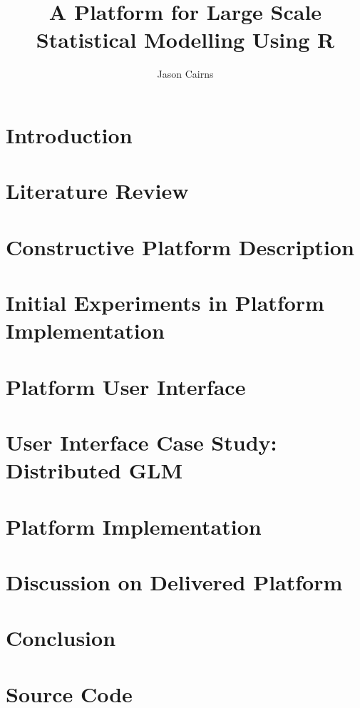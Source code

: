 \documentclass[11pt,a4paper,partial,examcopy]{aucklandthesis} %
\title{A Platform for Large Scale Statistical Modelling Using R}
\author{Jason Cairns}
\begin{document}


\chapter{Introduction}


\chapter{Literature Review}


\chapter{Constructive Platform Description}


\chapter{Initial Experiments in Platform Implementation}


\chapter{Platform User Interface}\label{sec:ui}


\chapter{User Interface Case Study: Distributed GLM}\label{sec:glm}


\chapter{Platform Implementation}


\chapter{Discussion on Delivered Platform}
\chapter{Conclusion}

\appendix
\chapter{Source Code}

\printbibliography
\end{document}
